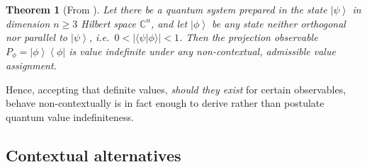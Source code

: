 \documentclass[%
 superscriptaddress,
 preprint,
 showpacs,
 showkeys,
 preprintnumbers,
  amsmath,amssymb,
  aps,
 pra,
  longbibliography,
  floatfix,
 ]{revtex4-1}
\newtheorem{theorem}{Theorem}
\theoremstyle{definition}
\newcommand{\C}{\mathbb{C}}%
\newcommand{\bra}[1]{\left< #1 \right|}
\newcommand{\ket}[1]{\left| #1 \right>}
\newcommand{\iprod}[2]{\langle #1 | #2 \rangle}
\begin{document}




\begin{theorem}[From \cite{2012-incomput-proofsCJ,PhysRevA.89.032109}]
	\label{thm:vi-everywhere}
		Let there be a quantum system prepared in the state
	$\ket{\psi}$ in dimension $n\ge 3$ Hilbert space $\C^n$, and let $\ket{\phi}$ be any state neither orthogonal nor parallel to $\ket{\psi}$, i.e.\ $0<|\iprod{\psi}{\phi}|<1$.
	Then the projection observable $P_\phi=\ket{\phi}\bra{\phi}$ is value indefinite under any non-contextual, admissible value assignment.
\end{theorem}

Hence,  accepting that definite values, \emph{should they exist} for certain observables, behave non-contextually is in fact enough to derive rather than postulate quantum value indefiniteness.


\subsection{Contextual alternatives}
\end{document}
